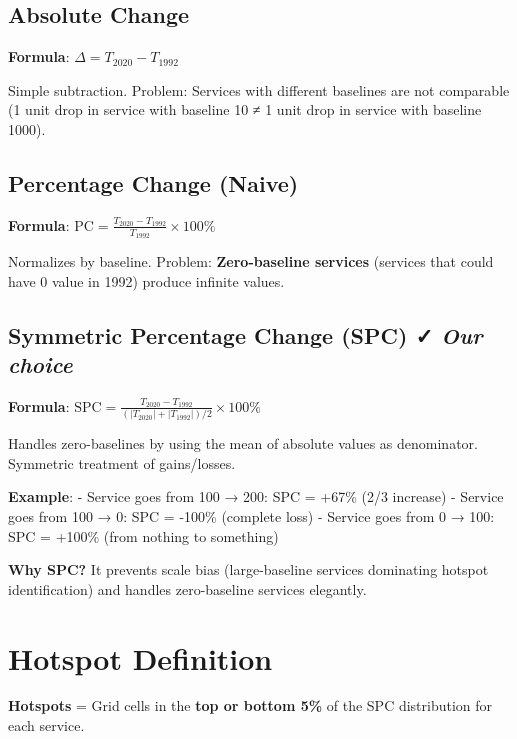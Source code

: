\documentclass[
  letterpaper,
  DIV=11,
  numbers=noendperiod]{scrreprt}
\begin{document}
\subsection{Absolute Change}\label{absolute-change}

\textbf{Formula}: \(\Delta = T_{2020} - T_{1992}\)

Simple subtraction. Problem: Services with different baselines are not
comparable (1 unit drop in service with baseline 10 ≠ 1 unit drop in
service with baseline 1000).

\subsection{Percentage Change (Naive)}\label{percentage-change-naive}

\textbf{Formula}:
\(\text{PC} = \frac{T_{2020} - T_{1992}}{T_{1992}} \times 100\%\)

Normalizes by baseline. Problem: \textbf{Zero-baseline services}
(services that could have 0 value in 1992) produce infinite values.

\subsection{\texorpdfstring{Symmetric Percentage Change (SPC) ✓
\emph{Our
choice}}{Symmetric Percentage Change (SPC) ✓ Our choice}}\label{symmetric-percentage-change-spc-our-choice}

\textbf{Formula}:
\(\text{SPC} = \frac{T_{2020} - T_{1992}}{(|T_{2020}| + |T_{1992}|) / 2} \times 100\%\)

Handles zero-baselines by using the mean of absolute values as
denominator. Symmetric treatment of gains/losses.

\textbf{Example}: - Service goes from 100 → 200: SPC = +67\% (2/3
increase) - Service goes from 100 → 0: SPC = -100\% (complete loss) -
Service goes from 0 → 100: SPC = +100\% (from nothing to something)

\textbf{Why SPC?} It prevents scale bias (large-baseline services
dominating hotspot identification) and handles zero-baseline services
elegantly.

\section{Hotspot Definition}\label{hotspot-definition}

\textbf{Hotspots} = Grid cells in the \textbf{top or bottom 5\%} of the
SPC distribution for each service.
\end{document}
